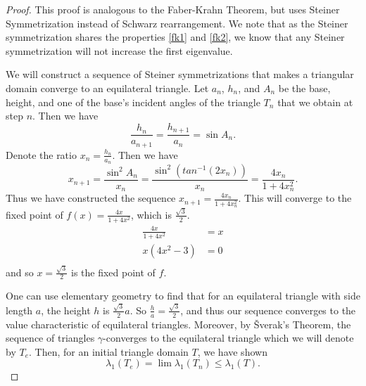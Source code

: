 \documentclass[12pt]{report}
\numberwithin{definition}{section}
\begin{document}
\begin{proof}
  This proof is analogous to the Faber-Krahn Theorem, but uses Steiner Symmetrization instead of Schwarz rearrangement.
  We note that as the Steiner symmetrization shares the properties \ref{fk1} and \ref{fk2}, we know that any Steiner symmetrization will not increase the first eigenvalue.


  We will construct a sequence of Steiner symmetrizations that makes a triangular domain converge to an equilateral triangle.
  Let $a_{n}$, $h_{n}$, and $A_{n}$ be the base, height, and one of the base's incident angles of the triangle $T_{n}$ that we obtain at step $n$.
  Then we have 
  \[
  \frac{h_{n}}{a_{n+1}} = \frac{h_{n+1}}{a_{n}} = \sin A_{n}
  .\] 
  Denote the ratio $x_{n} = \frac{h_{n}}{a_{n}}$.
  Then we have
  \[
  x_{n+1} = \frac{\sin^2 A_{n}}{x_{n}} = \frac{\sin^2(tan^{-1}(2x_{n}))}{x_{n}} = \frac{4x_{n}}{1 + 4x_{n}^2}
  .\] 
  Thus we have constructed the sequence $x_{n+1} = \frac{4x_{n}}{1 + 4x_{n}^2}$.
  This will converge to the fixed point of $f(x) = \frac{4x}{1 + 4x^2}$, which is $\frac{\sqrt{3}}{2}$.
  \begin{align*}
    \frac{4x}{1 + 4x^2} &= x \\
    x \left( 4x^2 - 3 \right ) &= 0 \\
  \end{align*}
  and so $x = \frac{\sqrt{3}}{2}$ is the fixed point of $f$.
    
  One can use elementary geometry to find that for an equilateral triangle with side length $a$, the height $h$ is  $\frac{\sqrt{3}}{2} a$.
  So $\frac{h}{a} = \frac{\sqrt{3}}{2}$, and thus our sequence converges to the value characteristic of equilateral triangles.
  Moreover, by Šverak's Theorem, the sequence of triangles $\gamma$-converges to the equilateral triangle which we will denote by $T_{e}$.
  Then, for an initial triangle domain $T$, we have shown 
  \[
  \lambda_{1}(T_{e}) = \lim \lambda_{1}(T_{n}) \leq \lambda_{1}(T)
  .\] 



\end{proof}
\end{document}
